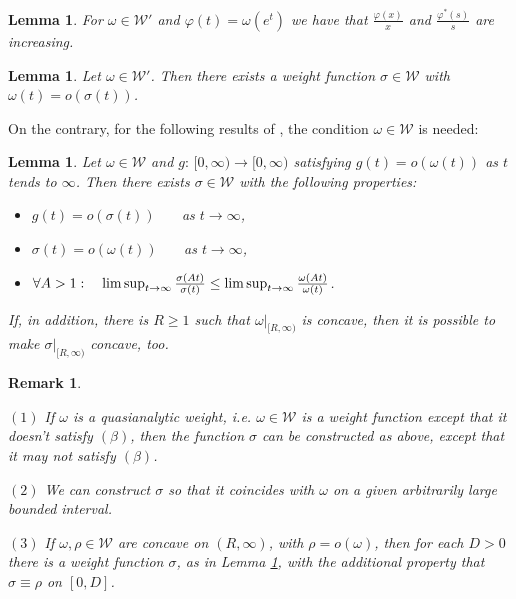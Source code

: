 \documentclass[twoside]{amsart}
\newtheorem{Rem}[Th]{Remark}
\newtheorem{Lemma}[Th]{Lemma}
\begin{document}
\begin{Lemma}
  For $\omega\in{\mathcal{W}}'$ and $\varphi(t)=\omega(e^t)$ we have that
  ${\displaystyle \frac{\varphi(x)}{x}}$ and ${\displaystyle
    \frac{\varphi^{*}(s)}{s}}$
are increasing.
\end{Lemma}

\begin{Lemma}
Let $\omega\in{\mathcal{W}}'$. Then there exists a weight function $\sigma\in{\mathcal{W}}$
with $\omega(t)=o(\sigma(t))$.
\end{Lemma}

On the contrary, for the following results of
\cite{BMT}, the condition
$\omega\in{\mathcal{W}}$ is needed:

\begin{Lemma}
  \label{1.7}
  Let $\omega\in{\mathcal{W}}$ and $g:\,[0,\infty)\rightarrow[0,\infty)$
satisfying $g(t)=o(\omega(t))$ as $t$ tends to $\infty$. Then there
exists $\sigma\in{\mathcal{W}}$ with the following properties:
\begin{itemize}
  \item[(i)]
$g(t)=o(\sigma(t))$ ~~~as $t\rightarrow\infty$,
\item[(ii)]
$\sigma(t)=o(\omega(t))$ ~~~as $t\rightarrow\infty$,
\item[(iii)]
  ${\displaystyle}\forall A>1:\quad
  \limsup_{t\to\infty}\frac{\sigma(At)}{\sigma(t)}\leq
  \limsup_{t\to\infty}
  \frac{\omega(At)}{\omega(t)}$.
\end{itemize}
If, in addition, there is $R\geq1$ such that $\left.\omega\right|_{[R,\infty)}$
is concave, then it is possible to make $\left.\sigma\right|_{[R,\infty)}$
  concave, too.
\end{Lemma}

\begin{Rem}
  \begin{em}
  \label{remG1}
  $(1)$ If $\omega$ is a quasianalytic weight, i.e.
  $\omega\in{\mathcal{W}}$ is a weight function except that it doesn't
satisfy $(\beta)$, then the function $\sigma$ can be constructed
as above, except that it may not satisfy $(\beta)$.

$(2)$ We can construct $\sigma$ so that it coincides with $\omega$
on a given arbitrarily large bounded interval.

$(3)$ If $\omega,\rho\in{\mathcal{W}}$ are concave on
  $\left(R,\infty\right)$,
with $\rho=o(\omega)$, then for each $D>0$ there is a weight function
$\sigma$, as in Lemma \ref{1.7}, with the additional property that
$\sigma\equiv\rho$ on $\left[0,D\right]$.
\end{em}
\end{Rem}
\end{document}
